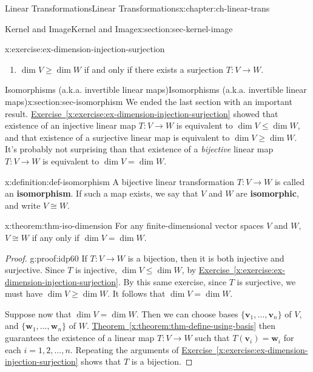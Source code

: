 \documentclass[oneside,10pt,]{book}
\newcommand{\xreffont}{\relax}
\newcommand{\terminology}[1]{\textbf{#1}}
\numberwithin{equation}{section}
\newcommand{\vv}{\mathbf{v}}
\newcommand{\ww}{\mathbf{w}}
\begin{document}
\begin{chapterptx}{Linear Transformations}{}{Linear Transformations}{}{}{x:chapter:ch-linear-trans}
\begin{sectionptx}{Kernel and Image}{}{Kernel and Image}{}{}{x:section:sec-kernel-image}
\begin{inlineexercise}{}{x:exercise:ex-dimension-injection-surjection}
\begin{enumerate}
\item{}\(\dim V\geq \dim W\) if and only if there exists a surjection \(T:V\to W\).%
\end{enumerate}
%
\end{inlineexercise}%
\end{sectionptx}
%
%
\typeout{************************************************}
\typeout{************************************************}
%
\begin{sectionptx}{Isomorphisms (a.k.a. invertible linear maps)}{}{Isomorphisms (a.k.a. invertible linear maps)}{}{}{x:section:sec-isomorphism}
We ended the last section with an important result. \hyperref[x:exercise:ex-dimension-injection-surjection]{Exercise~{\xreffont\ref{x:exercise:ex-dimension-injection-surjection}}} showed that existence of an injective linear map \(T:V\to W\) is equivalent to \(\dim V\leq \dim W\), and that existence of a surjective linear map is equivalent to \(\dim V\geq \dim W\). It's probably not surprising than that existence of a \emph{bijective} linear map \(T:V\to W\) is equivalent to \(\dim V = \dim W\).%
\begin{definition}{}{x:definition:def-isomorphism}%
A bijective linear transformation \(T:V\to W\) is called an \terminology{isomorphism}. If such a map exists, we say that \(V\) and \(W\) are \terminology{isomorphic}, and write \(V\cong W\).%
\end{definition}
\begin{theorem}{}{}{x:theorem:thm-iso-dimension}%
For any finite-dimensional vector spaces \(V\) and \(W\), \(V\cong W\) if any only if \(\dim V = \dim W\).%
\end{theorem}
\begin{proof}{}{g:proof:idp60}
If \(T:V\to W\) is a bijection, then it is both injective and surjective. Since \(T\) is injective, \(\dim V\leq \dim W\), by \hyperref[x:exercise:ex-dimension-injection-surjection]{Exercise~{\xreffont\ref{x:exercise:ex-dimension-injection-surjection}}}. By this same exercise,  since \(T\) is surjective, we must have \(\dim V\geq \dim W\). It follows that \(\dim V=\dim W\).%
\par
Suppose now that \(\dim V =\dim W\). Then we can choose bases \(\{\vv_1,\ldots, \vv_n\}\) of \(V\), and \(\{\ww_1,\ldots, \ww_n\}\) of \(W\). \hyperref[x:theorem:thm-define-using-basis]{Theorem~{\xreffont\ref{x:theorem:thm-define-using-basis}}} then guarantees the existence of a linear map \(T:V\to W\) such that \(T(\vv_i)=\ww_i\) for each \(i=1,2,\ldots, n\). Repeating the arguments of \hyperref[x:exercise:ex-dimension-injection-surjection]{Exercise~{\xreffont\ref{x:exercise:ex-dimension-injection-surjection}}} shows that \(T\) is a bijection.%

\end{proof}
\end{sectionptx}
\end{chapterptx}
\end{document}
